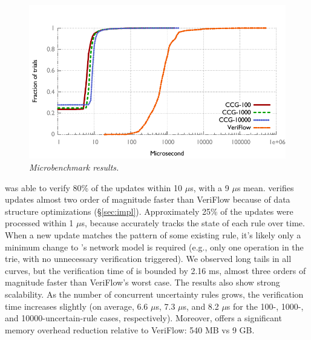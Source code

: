 \begin{figure}[!ht]
  \centering
  \vspace{-0.15in}
  \includegraphics[width=\columnwidth,trim= 0 5mm 0 10mm]{figs/micro}
  \vspace{-0.2in}
  \caption{\em \small Microbenchmark results.}
  \vspace{-0.15in}
  \label{fig:microbench}
\end{figure}

\name was able to verify 80\% of the updates within 10 $\mu$s, with a 9 $\mu$s mean. 
\name verifies updates almost two order of magnitude faster than VeriFlow because of 
data structure optimizations (\S\ref{sec:impl}). 
Approximately 25\% of the updates were processed within 1 $\mu$s, 
because \name accurately tracks the state of each rule over
time. When a new update matches the pattern of some existing rule, it's likely
only a minimum change to \name's network model is required (e.g., only one
operation in the trie, with no unnecessary verification triggered).
We observed long tails in all curves, but the verification time of \name is bounded by 2.16 ms, almost three orders of magnitude faster than VeriFlow's worst case. 
The results also show strong scalability. As the number of concurrent uncertainty rules grows, the verification time increases slightly (on average, 6.6 $\mu$s, 7.3 $\mu$s, and  8.2 $\mu$s for the 100-, 1000-, and 10000-uncertain-rule cases, respectively). Moreover, \name offers a significant memory overhead reduction relative to VeriFlow: 540 MB vs 9 GB.


